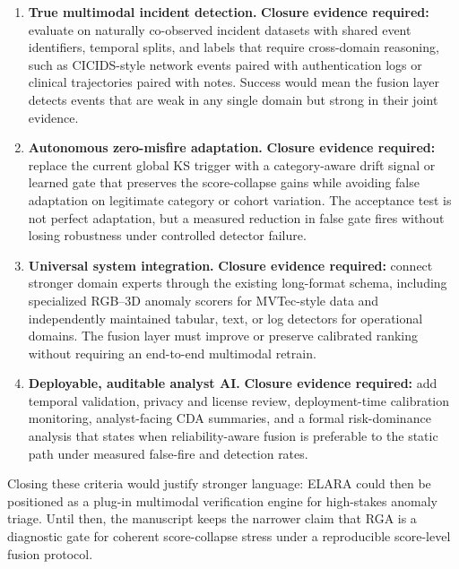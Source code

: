 \documentclass[10pt,conference]{IEEEtran}
\newcommand{\system}{ELARA}
\newcommand{\method}{RGA}
\begin{document}
\begin{enumerate}
  \item \textbf{True multimodal incident detection.} \textbf{Closure evidence
  required:} evaluate on naturally co-observed incident datasets with shared
  event identifiers, temporal splits, and labels that require cross-domain
  reasoning, such as CICIDS-style network events paired with authentication logs
  or clinical trajectories paired with notes. Success would mean the fusion
  layer detects events that are weak in any single domain but strong in their
  joint evidence.
  \item \textbf{Autonomous zero-misfire adaptation.} \textbf{Closure evidence
  required:} replace the current global KS trigger with a category-aware drift
  signal or learned gate that preserves the score-collapse gains while avoiding
  false adaptation on legitimate category or cohort variation. The acceptance
  test is not perfect adaptation, but a measured reduction in false gate fires
  without losing robustness under controlled detector failure.
  \item \textbf{Universal system integration.} \textbf{Closure evidence
  required:} connect stronger domain experts through the existing long-format
  schema, including specialized RGB--3D anomaly scorers for MVTec-style data and
  independently maintained tabular, text, or log detectors for operational
  domains. The fusion layer must improve or preserve calibrated ranking without
  requiring an end-to-end multimodal retrain.
  \item \textbf{Deployable, auditable analyst AI.} \textbf{Closure evidence
  required:} add temporal validation, privacy and license review, deployment-time
  calibration monitoring, analyst-facing CDA summaries, and a formal
  risk-dominance analysis that states when reliability-aware fusion is
  preferable to the static path under measured false-fire and detection rates.
\end{enumerate}

Closing these criteria would justify stronger language: \system{} could then be
positioned as a plug-in multimodal verification engine for high-stakes anomaly
triage. Until then, the manuscript keeps the narrower claim that \method{} is a
diagnostic gate for coherent score-collapse stress under a reproducible
score-level fusion protocol.
\end{document}
